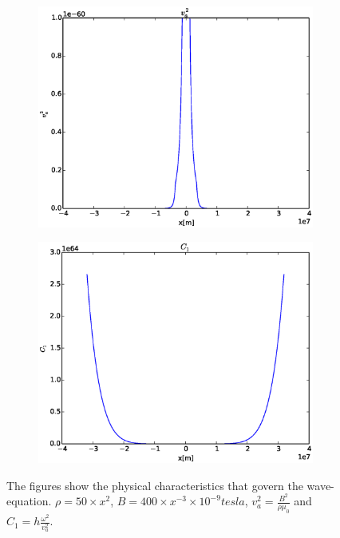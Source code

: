 \documentclass[x11names]{article}
\begin{document}
\begin{figure}
\begin{subfigure}{0.45\linewidth}
    \end{subfigure}
     \begin{subfigure}{0.45\linewidth}
      \includegraphics[width = \textwidth]{../source/va2}
    \end{subfigure}
    \begin{subfigure}{0.45\linewidth}
      \includegraphics[width = \textwidth]{../source/C1}
    \end{subfigure}
    \caption{The figures show the physical characteristics that govern the wave-equation. \(\rho = 50\times x^{2}\), \(B = 400\times x^{-3} \times 10^{-9}\si{tesla}\), \(v_a^2 = \frac{B^2}{\rho \mu_0}\) and \(C_1 = h \frac{\omega^2}{v_a^2}\).}
  \label{eq:va2}
  \end{figure}
\end{document}
